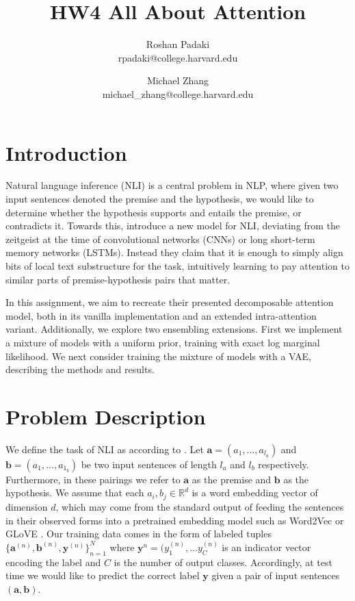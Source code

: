 \documentclass[11pt]{article}
\title{HW4 All About Attention}
\author{Roshan Padaki \\ rpadaki@college.harvard.edu \and Michael Zhang \\ michael\_zhang@college.harvard.edu }
\begin{document}
\maketitle{}
\section{Introduction}

Natural language inference (NLI) is a central problem in NLP, where given two input sentences denoted the premise and the hypothesis, we would like to determine whether the hypothesis supports and entails the premise, or contradicts it. Towards this, \citep{DBLP:journals/corr/ParikhT0U16} introduce a new model for NLI, deviating from the zeitgeist at the time of convolutional networks (CNNs) or long short-term memory networks (LSTMs). Instead they claim that it is enough to simply align bits of local text substructure for the task, intuitively learning to pay attention to similar parts of premise-hypothesis pairs that matter. 

In this assignment, we aim to recreate their presented decomposable attention model, both in its vanilla implementation and an extended intra-attention variant. Additionally, we explore two ensembling extensions. First we implement a mixture of models with a uniform prior, training with exact log marginal likelihood. We next consider training the mixture of models with a VAE, describing the methods and results.  

\section{Problem Description}
We define the task of NLI as according to \citep{DBLP:journals/corr/ParikhT0U16}. Let $\mathbf{a} = (a_1, \ldots , a_{l_{a}})$ and $\mathbf{b} = (a_1, \ldots, a_{1_{b}})$ be two input sentences of length $l_a$ and $l_b$ respectively. Furthermore, in these pairings we refer to $\mathbf{a}$ as the premise and $\mathbf{b}$ as the hypothesis. We assume that each $a_i, b_j \in \mathbb{R}^d$ is a word embedding vector of dimension $d$, which may come from the standard output of feeding the sentences in their observed forms into a pretrained embedding model such as Word2Vec or GLoVE \citep{Pennington14glove:global}. Our training data comes in the form of labeled tuples
$
\{ \mathbf{a}^{(n)}, \mathbf{b}^{(n)}, \mathbf{y}^{(n)}\}^N_{n=1}
$
where $\mathbf{y}^{n} = (y_1^(n), \ldots y_C^{(n)}$ is an indicator vector encoding the label and $C$ is the number of output classes. Accordingly, at test time we would like to predict the correct label $\mathbf{y}$ given a pair of input sentences $(\mathbf{a}, \mathbf{b})$.
\end{document}
